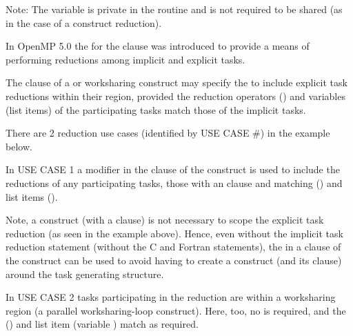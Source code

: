 Note: The  variable is private in the  routine
and is not required to be shared (as in the case of a  construct
reduction).




In OpenMP 5.0 the   for the  clause was
introduced to provide a means of performing reductions among implicit and explicit tasks.

The  clause of a  or worksharing construct may
specify the   to include explicit task reductions
within their region, provided the reduction operators ()
and variables (list items) of the participating tasks match those of the
implicit tasks.

There are 2 reduction use cases (identified by USE CASE \#) in the  example below.  

In USE CASE 1 a  modifier in the  clause 
of the  construct is used to include the reductions of any 
participating tasks, those with an  clause and matching 
 (\kcode{+}) and list items ().  

Note, a  construct (with a  clause) is not
necessary to scope the explicit task reduction (as seen in the example above). 
Hence, even without the implicit task reduction statement (without the C   
and Fortran  statements), the   
in a  clause of the  construct
can be used to avoid having to create a  construct 
(and its  clause) around the task generating structure.

In USE CASE 2 tasks participating in the reduction are within a
worksharing region (a parallel worksharing-loop construct).
Here, too, no  is required, and the  (\kcode{+})
and list item (variable ) match as required.





